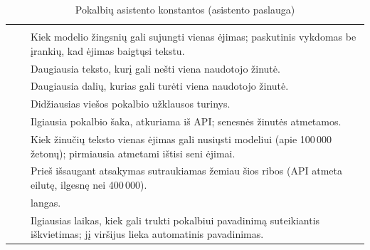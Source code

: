 \begin{xltabular}{\textwidth}{@{}L{44mm}L{19mm}Y@{}}
\caption{Pokalbių asistento konstantos (asistento paslauga)}\label{tab:config:chat}\\
\toprule
{} &  &  \\
\midrule
\endfirsthead
\toprule
{} &  &  \\
\midrule
\endhead
\bottomrule
\endlastfoot
{} &  & Kiek modelio žingsnių gali sujungti vienas ėjimas; paskutinis vykdomas be įrankių, kad ėjimas baigtųsi tekstu. \\
 &  & Daugiausia teksto, kurį gali nešti viena naudotojo žinutė. \\
 &  & Daugiausia dalių, kurias gali turėti viena naudotojo žinutė. \\
 &  & Didžiausias viešos pokalbio užklausos turinys. \\
 &  & Ilgiausia pokalbio šaka, atkuriama iš API; senesnės žinutės atmetamos. \\
 &  & Kiek žinučių teksto vienas ėjimas gali nusiųsti modeliui (apie 100\,000 žetonų); pirmiausia atmetami ištisi seni ėjimai. \\
 &  & Prieš išsaugant atsakymas sutraukiamas žemiau šios ribos (API atmeta eilutę, ilgesnę nei 400\,000). \\
 &  &  langas. \\
 &  & Ilgiausias laikas, kiek gali trukti pokalbiui pavadinimą suteikiantis iškvietimas; jį viršijus lieka automatinis pavadinimas. \\

\end{xltabular}
